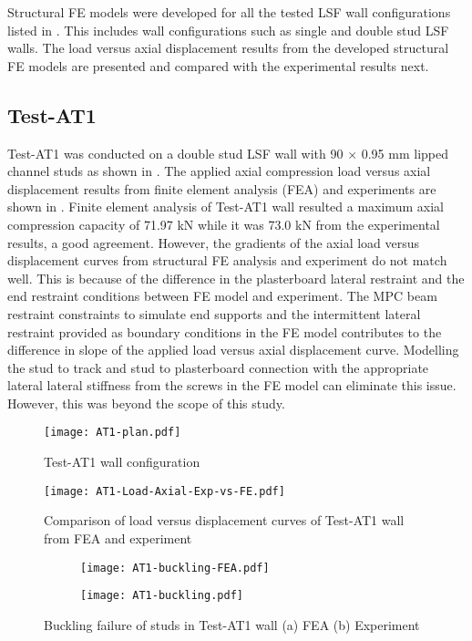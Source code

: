 Structural FE models were developed for all the tested LSF wall configurations listed in . This includes wall configurations such as single and double stud LSF walls. The load versus axial displacement results from the developed structural FE models are presented and compared with the experimental results next.  

\subsection*{Test-AT1}

Test-AT1 was conducted on a double stud LSF wall with 90 $\times$ 0.95 mm lipped channel studs as shown in . The applied axial compression load versus axial displacement results from finite element analysis (FEA) and experiments are shown in . Finite element analysis of Test-AT1 wall resulted a maximum axial compression capacity of 71.97 kN while it was 73.0 kN from the experimental results, a good agreement. However, the gradients of the axial load versus displacement curves from structural FE analysis and experiment do not match well. This is because of the difference in the plasterboard lateral restraint and the end restraint conditions between FE model and experiment. The MPC beam restraint constraints to simulate end supports and the intermittent lateral restraint provided as boundary conditions in the FE model contributes to the difference in slope of the applied load versus axial displacement curve. Modelling the stud to track and stud to plasterboard connection with the appropriate lateral lateral stiffness from the screws in the FE model can eliminate this issue. However, this was beyond the scope of this study.   
\begin{figure}[!htbp]
	\centering
			\texttt{[image: AT1-plan.pdf]}\\
		\caption{Test-AT1 wall configuration}
		\label{fig:AT1-plan-fea}
\end{figure}
\begin{figure}[!htbp]
	\centering
			\texttt{[image: AT1-Load-Axial-Exp-vs-FE.pdf]}\\
		\caption{Comparison of load versus displacement curves of Test-AT1 wall from FEA and experiment}
		\label{fig:AT1-fea-results}
\end{figure}
\begin{figure}[!htbp]
	\centering
	\begin{subfigure}[b]{0.4\textwidth}
		\centering
		\texttt{[image: AT1-buckling-FEA.pdf]}
		\caption{}
		\label{subfig:AT1-buckling-FEA}
	\end{subfigure}
	\begin{subfigure}[b]{0.4\textwidth}
		\centering
		\texttt{[image: AT1-buckling.pdf]}
		\caption{}
		\label{subfig:AT1-buckling-experiment}
	\end{subfigure}
	   \caption{Buckling failure of studs in Test-AT1 wall (a) FEA (b) Experiment}
	   \label{fig:AT1-buckling-fea-comparison}
\end{figure} 

